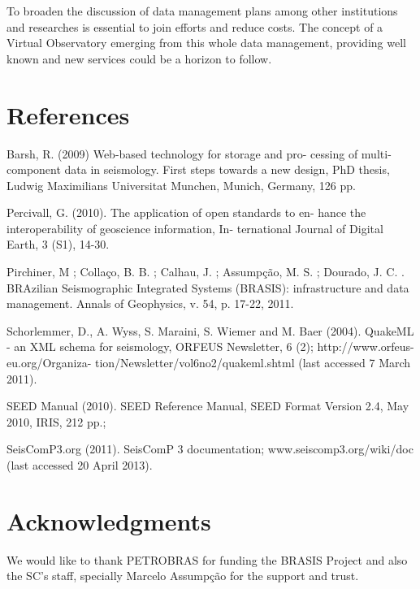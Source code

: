 \documentclass[twoside,letterpaper,twocolumn]{article}
\begin{document}
To broaden the discussion of data management plans among other institutions and researches is essential to join efforts and reduce costs. The concept of a Virtual Observatory emerging from this whole data management, providing well known and new services could be a horizon to follow.  


\section{References}

Barsh, R. (2009) Web-based technology for storage and pro- cessing of multi-component data in seismology. First steps towards a new design, PhD thesis, Ludwig Maximilians Universitat Munchen, Munich, Germany, 126 pp.

Percivall, G. (2010). The application of open standards to en- hance the interoperability of geoscience information, In- ternational Journal of Digital Earth, 3 (S1), 14-30.

Pirchiner, M ; Collaço, B. B. ; Calhau, J. ; Assumpção, M. S. ; Dourado, J. C. . BRAzilian Seismographic Integrated Systems (BRASIS): infrastructure and data management. Annals of Geophysics, v. 54, p. 17-22, 2011.

Schorlemmer, D., A. Wyss, S. Maraini, S. Wiemer and M. Baer (2004). QuakeML - an XML schema for seismology, ORFEUS Newsletter, 6 (2); http://www.orfeus-eu.org/Organiza- tion/Newsletter/vol6no2/quakeml.shtml (last accessed 7 March 2011).

SEED Manual (2010). SEED Reference Manual, SEED Format Version 2.4, May 2010, IRIS, 212 pp.; 

SeisComP3.org (2011). SeisComP 3 documentation; www.seiscomp3.org/wiki/doc (last accessed 20 April 2013).



\section{Acknowledgments}

We would like to thank PETROBRAS for funding the BRASIS Project and also the SC's staff, specially Marcelo Assumpção for the support and trust.
\end{document}
